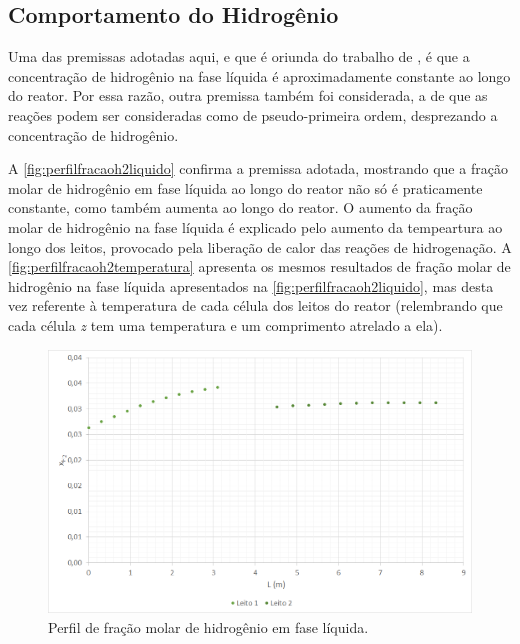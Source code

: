 \subsection{Comportamento do Hidrogênio} \label{comportamentodohidrogenio}

Uma das premissas adotadas aqui, e que é oriunda do trabalho de
, é que a concentração de hidrogênio na
fase líquida é aproximadamente constante ao longo do reator. Por essa razão,
outra premissa também foi considerada, a de que as reações podem ser
consideradas como de pseudo-primeira ordem, desprezando a concentração de
hidrogênio.

A \autoref{fig:perfilfracaoh2liquido} confirma a premissa adotada, mostrando
que a fração molar de hidrogênio em fase líquida ao longo do reator não só é
praticamente constante, como também aumenta ao longo do reator. O aumento da
fração molar de hidrogênio na fase líquida é explicado pelo aumento da
tempeartura ao longo dos leitos, provocado pela liberação de calor das reações
de hidrogenação. A \autoref{fig:perfilfracaoh2temperatura} apresenta os
mesmos resultados de fração molar de hidrogênio na fase líquida
apresentados na \autoref{fig:perfilfracaoh2liquido}, mas desta vez referente à
temperatura de cada célula dos leitos do reator (relembrando que cada célula
\emph{z} tem uma temperatura e um comprimento atrelado a ela).

\begin{figure}[htb]
\centering \includegraphics[scale=0.4]{images/Chap4/perfilfracaoh2liquido.png}
\caption{Perfil de fração molar de hidrogênio em fase líquida.}
\label{fig:perfilfracaoh2liquido}
\end{figure}

